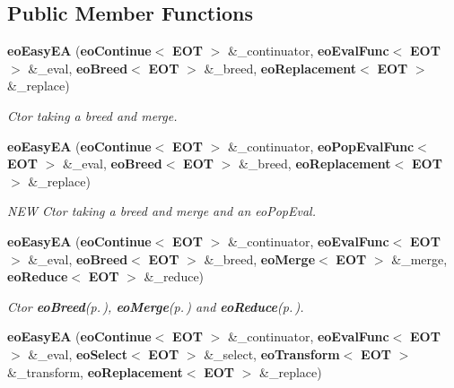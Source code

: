 \subsection*{Public Member Functions}
\begin{CompactItemize}
\item 
{\bf eo\-Easy\-EA} ({\bf eo\-Continue}$<$ {\bf EOT} $>$ \&\_\-continuator, {\bf eo\-Eval\-Func}$<$ {\bf EOT} $>$ \&\_\-eval, {\bf eo\-Breed}$<$ {\bf EOT} $>$ \&\_\-breed, {\bf eo\-Replacement}$<$ {\bf EOT} $>$ \&\_\-replace)\label{classeo_easy_e_a_a0}

\begin{CompactList}\small\item\em Ctor taking a breed and merge. \item\end{CompactList}\item 
{\bf eo\-Easy\-EA} ({\bf eo\-Continue}$<$ {\bf EOT} $>$ \&\_\-continuator, {\bf eo\-Pop\-Eval\-Func}$<$ {\bf EOT} $>$ \&\_\-eval, {\bf eo\-Breed}$<$ {\bf EOT} $>$ \&\_\-breed, {\bf eo\-Replacement}$<$ {\bf EOT} $>$ \&\_\-replace)\label{classeo_easy_e_a_a1}

\begin{CompactList}\small\item\em NEW Ctor taking a breed and merge and an eo\-Pop\-Eval. \item\end{CompactList}\item 
{\bf eo\-Easy\-EA} ({\bf eo\-Continue}$<$ {\bf EOT} $>$ \&\_\-continuator, {\bf eo\-Eval\-Func}$<$ {\bf EOT} $>$ \&\_\-eval, {\bf eo\-Breed}$<$ {\bf EOT} $>$ \&\_\-breed, {\bf eo\-Merge}$<$ {\bf EOT} $>$ \&\_\-merge, {\bf eo\-Reduce}$<$ {\bf EOT} $>$ \&\_\-reduce)\label{classeo_easy_e_a_a2}

\begin{CompactList}\small\item\em Ctor {\bf eo\-Breed}{\rm (p.\,\pageref{classeo_breed})}, {\bf eo\-Merge}{\rm (p.\,\pageref{classeo_merge})} and {\bf eo\-Reduce}{\rm (p.\,\pageref{classeo_reduce})}. \item\end{CompactList}\item 
{\bf eo\-Easy\-EA} ({\bf eo\-Continue}$<$ {\bf EOT} $>$ \&\_\-continuator, {\bf eo\-Eval\-Func}$<$ {\bf EOT} $>$ \&\_\-eval, {\bf eo\-Select}$<$ {\bf EOT} $>$ \&\_\-select, {\bf eo\-Transform}$<$ {\bf EOT} $>$ \&\_\-transform, {\bf eo\-Replacement}$<$ {\bf EOT} $>$ \&\_\-replace)\label{classeo_easy_e_a_a3}


\end{CompactItemize}
